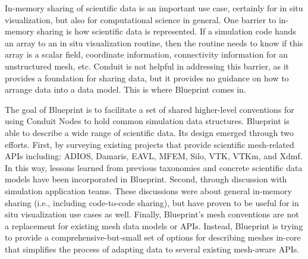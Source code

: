 
%
In-memory sharing of scientific data is an important use case,
certainly for in situ visualization, but also for computational science in general.
%
One barrier to in-memory sharing is how scientific data is represented.
%
If a simulation code hands an array to an in situ visualization routine, then the routine
needs to know if this array is a scalar field, coordinate information, connectivity information
for an unstructured mesh, etc.
%
Conduit is not helpful in addressing this barrier, 
as it provides a foundation for sharing data, but it provides no guidance on
how to arrange
data into a data model.
%
This is where Blueprint comes in.
%
%


The goal of Blueprint is to facilitate a set of shared higher-level
conventions for using Conduit Nodes to hold common simulation data structures.
%
Blueprint is able to describe a wide range of scientific data.
%
Its design emerged through two efforts.
%
First, by surveying existing
projects that provide scientific mesh-related APIs including: ADIOS, Damaris,
EAVL, MFEM, Silo, VTK, VTKm, and Xdmf. 
%
In this way, lessons learned from previous taxonomies and concrete scientific data models
have been incorporated in Blueprint.
%
Second, through discussion with simulation application teams.
%
These discussions were about general in-memory sharing (i.e., including code-to-code sharing),
but have proven to be useful for in situ visualization use cases as well.
%
Finally,
Blueprint's mesh conventions are not a replacement for existing mesh data models or APIs. 
%
Instead, Blueprint is trying to provide a comprehensive-but-small set of options for 
describing meshes in-core that simplifies 
the process of adapting data to several existing mesh-aware APIs.



%
%

